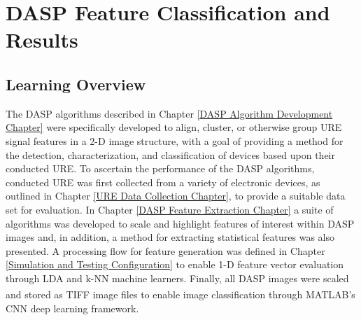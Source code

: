 
\chapter{DASP Feature Classification and Results}
\label{DASP Device Classification Chapter}

\section[Learning Overview]{Learning Overview}

The DASP algorithms described in Chapter \ref{DASP Algorithm Development Chapter} were specifically developed to align, cluster, or otherwise group URE signal features in a 2-D image structure, with a goal of providing a method for the detection, characterization, and classification of devices based upon their conducted URE.  To ascertain the performance of the DASP algorithms, conducted URE was first collected from a variety of electronic devices, as outlined in Chapter \ref{URE Data Collection Chapter}, to provide a suitable data set for evaluation.  In Chapter \ref{DASP Feature Extraction Chapter} a suite of algorithms was developed to scale and highlight features of interest within DASP images and, in addition, a method for extracting statistical features was also presented.  A processing flow for feature generation was defined in Chapter \ref{Simulation and Testing Configuration} to enable 1-D feature vector evaluation through LDA and k-NN machine learners.  Finally, all DASP images were scaled and stored as TIFF image files to enable image classification through MATLAB\textsuperscript \textregistered 's CNN deep learning framework.

